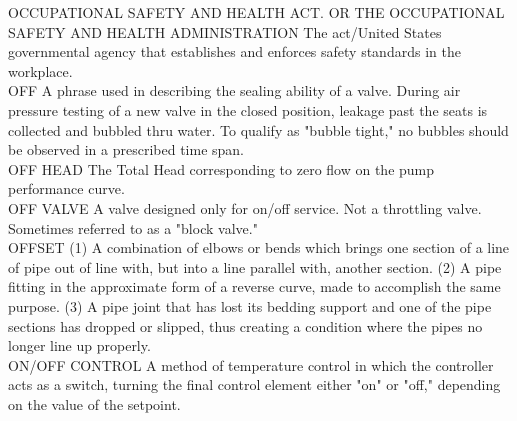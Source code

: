 OCCUPATIONAL SAFETY AND HEALTH ACT. OR THE OCCUPATIONAL SAFETY AND HEALTH ADMINISTRATION
The act/United States governmental agency that establishes and enforces safety standards in the workplace.
\vspace{0.3cm}\\

OFF
A phrase used in describing the sealing ability of a valve. During air pressure testing of a new valve in the closed position, leakage past the seats is collected and bubbled thru water. To qualify as "bubble tight," no bubbles should be observed in a prescribed time span.
\vspace{0.3cm}\\
OFF HEAD
The Total Head corresponding to zero flow on the pump performance curve.
\vspace{0.3cm}\\
OFF VALVE
A valve designed only for on/off service. Not a throttling valve. Sometimes referred to as a "block valve."
\vspace{0.3cm}\\
OFFSET
(1) A combination of elbows or bends which brings one section of a line of pipe out of line with, but into a line parallel with, another section. (2) A pipe fitting in the approximate form of a reverse curve, made to accomplish the same purpose. (3) A pipe joint that has lost its bedding support and one of the pipe sections has dropped or slipped, thus creating a condition where the pipes no longer line up properly. 
\vspace{0.3cm}\\
ON/OFF CONTROL
A method of temperature control in which the controller acts as a switch, turning the final control element either "on" or "off," depending on the value of the setpoint.
\vspace{0.3cm}\\

